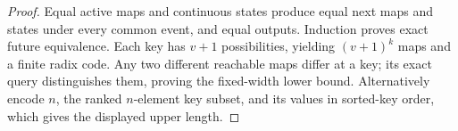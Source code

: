 \begin{proof}
Equal active maps and continuous states produce equal next maps and states
under every common event, and equal outputs. Induction proves exact
future equivalence. Each key has $v+1$ possibilities, yielding $(v+1)^k$
maps and a finite radix code. Any two different reachable maps differ at
a key; its exact query distinguishes them, proving the fixed-width lower
bound. Alternatively encode $n$, the ranked $n$-element key subset, and
its values in sorted-key order, which gives the displayed upper length.
\end{proof}
